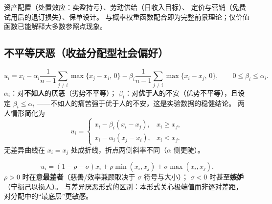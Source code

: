 资产配置（处置效应：卖盈持亏）、劳动供给（日收入目标）、
定价与营销（免费试用后的退订损失）、保单设计。
与概率权重函数配合即为完整前景理论；仅价值函数已能解释大多数参照点现象。

\subsection{不平等厌恶（收益分配型社会偏好）}\label{subsec:fs}

\[
u_i=x_i-\alpha_i\frac{1}{n-1}\sum_{j\ne i}\max\{x_j-x_i,\,0\}
-\beta_i\frac{1}{n-1}\sum_{j\ne i}\max\{x_i-x_j,\,0\},
\qquad 0\le\beta_i\le\alpha_i.
\]
$\alpha_i$：对\textbf{不如人}的厌恶（劣势不平等）；
$\beta_i$：对\textbf{优于人}的不安（优势不平等），且设定 $\beta_i\le\alpha_i$
——不如人的痛苦强于优于人的不安，这是实验数据的稳健结论。
两人情形简化为
\[
u_i=
\begin{cases}
x_i-\beta_i(x_i-x_j), & x_i\ge x_j,\\[2pt]
x_i-\alpha_i(x_j-x_i), & x_i<x_j.
\end{cases}
\]
无差异曲线在 $x_i=x_j$ 处成折线，折点两侧斜率不同（$\alpha$ 侧更陡）。

\begin{center}
\end{center}

\[
u_i=(1-\rho-\sigma)x_i+\rho\min(x_i,x_j)+\sigma\max(x_i,x_j).
\]
$\rho>0$ 时在意\textbf{最差者}（慈善/效率兼顾取决于 $\sigma$ 符号与大小）；
$\sigma<0$ 时甚至\textbf{嫉妒}（宁损己以损人）。
与差异厌恶形式的区别：本形式关心极端值而非逐对差距，
对分配中的“最底层”更敏感。

